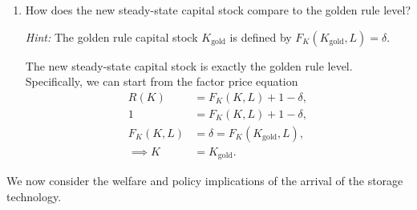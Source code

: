 \documentclass[11pt,english]{article}
\begin{document}
\begin{enumerate}
    \item[(k)] How does the new steady-state capital stock compare to the golden
        rule level?
 
        \textit{Hint:} The golden rule capital stock $K_{\mathrm{gold}}$ is
        defined by $F_K(K_{\mathrm{gold}}, L) = \delta$.
    \begin{solution}
 The new steady-state capital stock is exactly the golden rule level. Specifically, we can start from the factor price equation
\begin{align*}
R(K) &= F_K(K,L) + 1 - \delta,\\
1 &= F_K(K,L) + 1 - \delta,\\
F_K(K,L) &= \delta = F_K(K_{\mathrm{gold}}, L),\\
\implies K &= K_{\mathrm{gold}}.
\end{align*}
    \end{solution}
\end{enumerate}
 
 
We now consider the welfare and policy implications of the arrival of the
storage technology.
 
\end{document}
